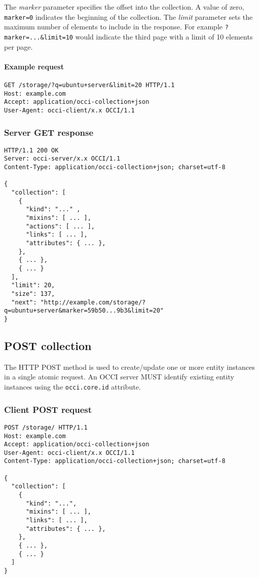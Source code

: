 \documentclass[10pt,a4paper]{article}
\begin{document}
The {\em marker} parameter specifies the offset into the collection. A value of
zero, {\tt marker=0} indicates the beginning of the collection.
%
The {\em limit} parameter sets the maximum number of elements to include in the
response. For example {\tt ?marker=...\&limit=10} would indicate the third page
with a limit of 10 elements per page.

\paragraph*{Example request}

\begin{verbatim}
GET /storage/?q=ubuntu+server&limit=20 HTTP/1.1
Host: example.com
Accept: application/occi-collection+json
User-Agent: occi-client/x.x OCCI/1.1
\end{verbatim}

\subsubsection{Server GET response}
\begin{verbatim}
HTTP/1.1 200 OK
Server: occi-server/x.x OCCI/1.1
Content-Type: application/occi-collection+json; charset=utf-8

{
  "collection": [
    {
      "kind": "..." ,
      "mixins": [ ... ],
      "actions": [ ... ],
      "links": [ ... ],
      "attributes": { ... },
    },
    { ... },
    { ... }
  ],
  "limit": 20,
  "size": 137,
  "next": "http://example.com/storage/?q=ubuntu+server&marker=59b50...9b3&limit=20"
}
\end{verbatim}


\subsection{POST collection}
The HTTP POST method is used to create/update one or more entity instances in
a single atomic request. An OCCI server MUST identify existing entity instances
using the {\tt occi.core.id} attribute.

\subsubsection{Client POST request}
\begin{verbatim}
POST /storage/ HTTP/1.1
Host: example.com
Accept: application/occi-collection+json
User-Agent: occi-client/x.x OCCI/1.1
Content-Type: application/occi-collection+json; charset=utf-8

{
  "collection": [
    {
      "kind": "...",
      "mixins": [ ... ],
      "links": [ ... ],
      "attributes": { ... },
    },
    { ... },
    { ... }
  ]
}
\end{verbatim}
\end{document}

